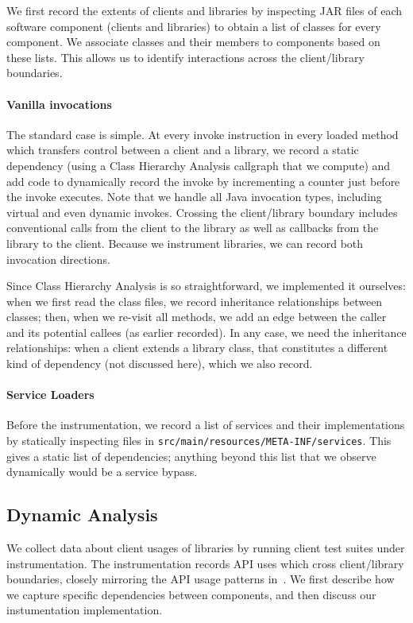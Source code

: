 We first record the extents of clients and libraries by inspecting JAR
files of each software component (clients and libraries) to obtain a
list of classes for every component. We associate classes and their
members to components based on these lists.  This allows us to
identify interactions across the client/library boundaries.


\paragraph{Vanilla invocations}
The standard case is simple. At every invoke instruction in every
loaded method which transfers control between a client and a
library, we record a static dependency (using a Class Hierarchy
Analysis callgraph that we compute) and add code to dynamically record
the invoke by incrementing a counter just before the invoke
executes. Note that we handle all Java invocation types, including
virtual and even dynamic invokes. Crossing the client/library boundary
includes conventional calls from the client to the library as well as
callbacks from the library to the client.  Because we instrument
libraries, we can record both invocation directions.

Since Class Hierarchy Analysis is so straightforward, we implemented
it ourselves: when we first read the class files, we record
inheritance relationships between classes; then, when we re-visit all
methods, we add an edge between the caller and its potential callees
(as earlier recorded).  In any case, we need the inheritance
relationships: when a client extends a library class, that constitutes
a different kind of dependency (not discussed here), which we also record.

\paragraph{Service Loaders} Before the instrumentation, we record a list 
of services and their implementations by statically inspecting files in \texttt{src/main/resources/META-INF/services}. This gives a static list of dependencies; anything beyond this list that we observe dynamically would be a service bypass.

\subsection{Dynamic Analysis}
\label{subsec:dynamic}
We collect data about client usages of libraries by running client
test suites under instrumentation. The instrumentation records API
uses which cross client/library boundaries, closely mirroring the API
usage patterns
in~\cite{venkatanarayanan22:_study_lever_api_usage_patter}. We first
describe how we capture specific dependencies between components, and
then discuss our instumentation implementation.

